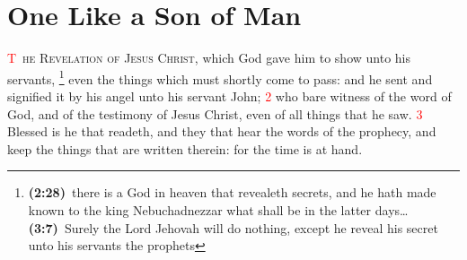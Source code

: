 \documentclass[12pt,twoside]{memoir}
\newcommand{\cbibleref}[3]{\textbf{\ibibleverse[textit]{#1}(#2)}\ {#3}}
\newcommand{\cbiblefootduo}[6]{\footnote{\cbibleref{#1}{#2}{#3}\ldots \cbibleref{#4}{#5}{#6}}}
\newcommand{\vnum}[1]{\textcolor{red}{\normalsize{#1}}}
\newcommand{\blankpage}{\newpage
\thispagestyle{plain} %
\mbox{}}
\begin{document}
\ClearShipoutPicture
{}

\blankpage
\clearpage
\clearpage

\tableofcontents
\clearpage
\listoffigures
\clearpage
\ClearShipoutPicture
{}

\pagestyle{headings}
\mainmatter
\trimFrame
\chapter{One Like a Son of Man}
\lettrine[lines=4]{\textcolor{red}{T}}{\ he Revelation of Jesus Christ}, which God gave him to show unto his servants,%
	\cbiblefootduo{Daniel}{2:28}{there is a God in heaven that revealeth secrets, and he hath made known to the king Nebuchadnezzar what shall be in the latter days}%
			{Amos}{3:7}{Surely the Lord Jehovah will do nothing, except he reveal his secret unto his servants the prophets}%
even the things which must shortly come to pass: and he sent and signified it by his angel unto his servant John; %
\vnum{2} who bare witness of the word of God, and of the testimony of Jesus Christ, even of all things that he saw. %
\vnum{3} Blessed is he that readeth, and they that hear the words of the prophecy, and keep the things that are written therein: for the time is at hand.
\end{document}
